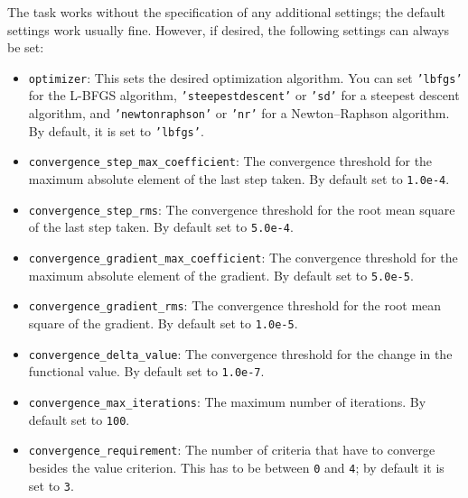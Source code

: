 \documentclass[]{tufte-book}
\begin{document}
The task works without the specification of any additional settings; the default settings work usually fine. However,
if desired, the following settings can always be set:
\begin{itemize}
\item \texttt{optimizer}: This sets the desired optimization algorithm. You can set \texttt{'lbfgs'} for the L-BFGS algorithm,
\texttt{'steepestdescent'} or \texttt{'sd'} for a steepest descent algorithm, and \texttt{'newtonraphson'} or \texttt{'nr'} for
a Newton--Raphson algorithm. By default, it is set to \texttt{'lbfgs'}.
\item \texttt{convergence\_step\_max\_coefficient}: The convergence threshold for the maximum absolute element of the last step taken.
By default set to \texttt{1.0e-4}.
\item \texttt{convergence\_step\_rms}: The convergence threshold for the root mean square of the last step taken. By default set to 
\texttt{5.0e-4}.
\item \texttt{convergence\_gradient\_max\_coefficient}: The convergence threshold for the maximum absolute element of the gradient. 
By default set to \texttt{5.0e-5}.
\item \texttt{convergence\_gradient\_rms}: The convergence threshold for the root mean square of the gradient. By default set to 
\texttt{1.0e-5}.
\item \texttt{convergence\_delta\_value}: The convergence threshold for the change in the functional value. By default set to
\texttt{1.0e-7}.
\item \texttt{convergence\_max\_iterations}: The maximum number of iterations. By default set to \texttt{100}.
\item \texttt{convergence\_requirement}: The number of criteria that have to converge besides the value criterion. This 
has to be between \texttt{0} and \texttt{4}; by default it is set to \texttt{3}.
\end{itemize}
\end{document}
